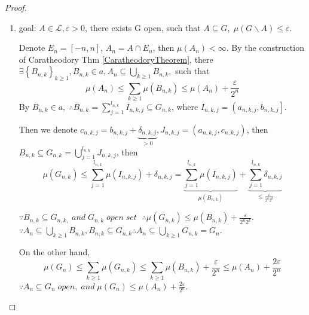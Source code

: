 \begin{proof}
	\text{}
	\begin{enumerate}
		\item goal: $ A \in \mathcal{L}, \varepsilon >0 $, there exists G open, such that $A \subseteq G,\;\mu \left( {G\backslash A} \right) \leqslant \varepsilon $.
		
		Denote ${E_n} = \left[ { - n,n} \right]$, ${A_n} = A \cap {E_n}$, then $\mu \left( {{A_n}} \right) < \infty $. By the construction of Caratheodory Thm \ref{CaratheodoryTheorem}, there $\exists {\left\{ {{B_{n,k}}} \right\}_{k \geqslant 1}},{B_{n,k}} \in a,{A_n} \subseteq \bigcup\limits_{k \geqslant 1} {{B_{n,k}}} ,$ such that 
		\begin{equation}
		\mu \left( {{A_n}} \right) \leqslant \sum\limits_{k \geqslant 1} {\mu \left( {{B_{n,k}}} \right)}  \leqslant \mu \left( {{A_n}} \right) + \frac{\varepsilon }{{{2^n}}}
		\label{eq9.13}
		\end{equation} 
		By ${B_{n,k}} \in a,\;\therefore {B_{n,k}} = \sum\limits_{j = 1}^{{l_{n,k}}} {{I_{n,k,j}}}  \subseteq {G_{n,k}}$, where ${I_{n,k,j}} = \left( {{a_{n,k,j}},{b_{n,k,j}}} \right]$. 
		
		Then we denote ${c_{n,k,j}} = {b_{n,k,j}} + \underbrace {{\delta _{n,k,j}}}_{ > 0},{J_{n,k,j}} = \left( {{a_{n,k,j}},{c_{n,k,j}}} \right)$, then ${B_{n,k}} \subseteq {G_{n,k}} = \bigcup\limits_{j = 1}^{{l_{n,k}}} {{J_{n,k,j}}} $, then 
		\begin{equation}
	    \mu \left( {{G_{n,k}}} \right) \leqslant \sum\limits_{j = 1}^{{l_{n,k}}} {\mu \left( {{I_{n,k,j}}} \right) + {\delta _{n,k,j}}}  = \underbrace {\sum\limits_{j = 1}^{{l_{n,k}}} {\mu \left( {{I_{n,k,j}}} \right)} }_{\mu \left( {{B_{n,k}}} \right)} + \underbrace {\sum\limits_{j = 1}^{{l_{n,k}}} {{\delta _{n,k,j}}} }_{ \leqslant \frac{\varepsilon }{{{2^n}{2^k}}}}
	    \label{eq9.14}
		\end{equation}
		
		$ \because {B_{n,k}} \subseteq {G_{n,k,}}\;and\;{G_{n,k}}\;open\;set\; $ $\therefore \mu \left( {{G_{n,k}}} \right) \leqslant \mu \left( {{B_{n,k}}} \right) + \frac{\varepsilon }{{{2^n}{2^k}}}$. $\because {A_n} \subseteq \bigcup\limits_{k \geqslant 1} {{B_{n,k}}} ,{B_{n,k}} \subseteq {G_{n,k}}\therefore {A_n} \subseteq \bigcup\limits_{k \geqslant 1} {{G_{n,k}}}  = {G_n}$.
		
        On the other hand, 
        \begin{equation}
        \mu \left( {{G_n}} \right) \leqslant \sum\limits_{k \geqslant 1} {\mu \left( {{G_{n,k}}} \right)}  \leqslant \sum\limits_{k \geqslant 1} {\mu \left( {{B_{n,k}}} \right)}  + \frac{\varepsilon }{{{2^n}}} \leqslant \mu \left( {{A_n}} \right) + \frac{{2\varepsilon }}{{{2^n}}}
        \label{eq9.15}
        \end{equation}
        $\because {A_n} \subseteq {G_n}\;open,\;and\;\mu \left( {{G_n}} \right) \leqslant \mu \left( {{A_n}} \right) + \frac{{2\varepsilon }}{{{2^n}}}$.
        

\end{enumerate}
\end{proof}
